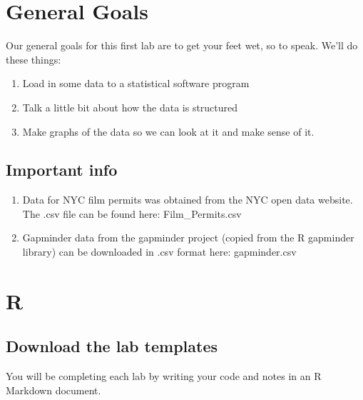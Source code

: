 \documentclass[
]{book}
\providecommand{\tightlist}{%
  \setlength{\itemsep}{0pt}\setlength{\parskip}{0pt}}
\begin{document}
\hypertarget{general-goals}{%
\section{General Goals}\label{general-goals}}

Our general goals for this first lab are to get your feet wet, so to speak. We'll do these things:

\begin{enumerate}
\def\labelenumi{\arabic{enumi}.}
\tightlist
\item
  Load in some data to a statistical software program
\item
  Talk a little bit about how the data is structured
\item
  Make graphs of the data so we can look at it and make sense of it.
\end{enumerate}

\hypertarget{important-info}{%
\subsection{Important info}\label{important-info}}

\begin{enumerate}
\def\labelenumi{\arabic{enumi}.}
\item
  Data for NYC film permits was obtained from the NYC open data website. The .csv file can be found here: Film\_Permits.csv
\item
  Gapminder data from the gapminder project (copied from the R gapminder library) can be downloaded in .csv format here: gapminder.csv
\end{enumerate}

\hypertarget{r-1}{%
\section{R}\label{r-1}}

\hypertarget{download-the-lab-templates}{%
\subsection{Download the lab templates}\label{download-the-lab-templates}}

You will be completing each lab by writing your code and notes in an R Markdown document.
\end{document}

